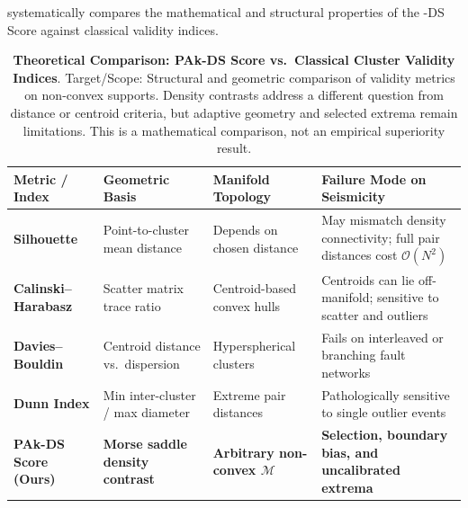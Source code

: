  systematically compares the
mathematical and structural properties of the \pak{}-DS Score
against classical validity indices.
\begin{landscape}
  \begin{table}[htbp]
    \centering
    \small
    \begin{threeparttable}
      \caption{\textbf{Theoretical Comparison: PAk-DS Score
        vs.\ Classical Cluster Validity Indices}. Target/Scope:
        Structural and geometric comparison of validity metrics on
        non-convex supports. Density contrasts address a different
        question from distance or centroid criteria, but adaptive
        geometry and selected extrema remain limitations. This is a
      mathematical comparison, not an empirical superiority result.}
      \label{tab:cvi_comparison}
      \begin{tabularx}{\linewidth}{l >{\raggedright\arraybackslash}X
        >{\raggedright\arraybackslash}X >{\raggedright\arraybackslash}X}
        \toprule
        \textbf{Metric / Index} & \textbf{Geometric Basis} &
        \textbf{Manifold Topology} & \textbf{Failure Mode on Seismicity} \\
        \midrule
        \textbf{Silhouette \parencite{rousseeuw1987}} &
        Point-to-cluster mean distance & Depends on chosen distance &
        May mismatch density connectivity; full pair distances cost
        $\mathcal O(N^2)$ \\
        \textbf{Calinski--Harabasz \parencite{calinski1974}} & Scatter
        matrix trace ratio & Centroid-based convex hulls & Centroids
        can lie off-manifold; sensitive to scatter and outliers \\
        \textbf{Davies--Bouldin \parencite{davies1979}} & Centroid
        distance vs.\ dispersion & Hyperspherical clusters & Fails on
        interleaved or branching fault networks \\
        \textbf{Dunn Index \parencite{dunn1974}} & Min inter-cluster /
        max diameter & Extreme pair distances & Pathologically
        sensitive to single outlier events \\
        \textbf{PAk-DS Score (Ours)} & \textbf{Morse saddle density
        contrast} & \textbf{Arbitrary non-convex $\mathcal{M}$} &
        \textbf{Selection, boundary bias, and uncalibrated extrema} \\
        \bottomrule
      \end{tabularx}
      \begin{tablenotes}[flushleft]

\end{tablenotes}
\end{threeparttable}
\end{table}
\end{landscape}
